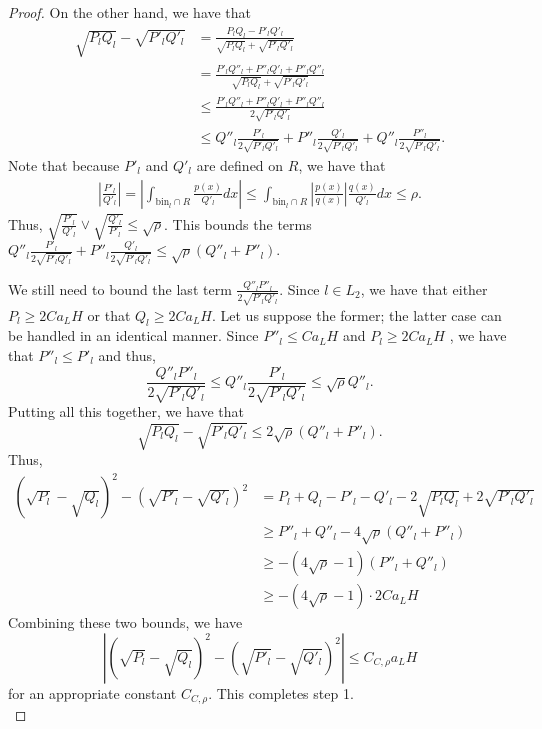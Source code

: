 \documentclass{article}
\newcommand{\bin}{\text{bin}}
\begin{document}
\begin{proof}
On the other hand, we have that
\begin{align*}
\sqrt{P_l Q_l} - \sqrt{P'_l Q'_l} 
  &= \frac{ P_l Q_l  - P'_l Q'_l }
          {  \sqrt{P_l Q_l} + \sqrt{P'_l Q'_l} }\\
  &= \frac{ P'_l Q''_l + P''_l Q'_l + P''_l Q''_l} 
          {  \sqrt{ P_l Q_l } + \sqrt{P'_l Q'_l} } \\
  &\leq  \frac{ P'_l Q''_l + P''_l Q'_l + P''_l Q''_l} 
          {  2 \sqrt{P'_l Q'_l} } \\
  &\leq Q''_l \frac{P'_l}{2 \sqrt{P'_l Q'_l}} + P''_l \frac{Q'_l}{2\sqrt{P'_l Q'_l}}
        + Q''_l \frac{P''_l}{2 \sqrt{P'_l Q'_l}}. 
\end{align*}
Note that because $P'_l$ and $Q'_l$ are defined on $R$, we have that
\begin{align*}
\left| \frac{P'_l}{Q'_l} \right| =
\left| \int_{\bin_l \cap R} \frac{ p(x)}{Q'_l} dx \right| 
 \leq \int_{\bin_l \cap R} \left| \frac{p(x)}{q(x)} \right| \frac{q(x)}{Q'_l} dx 
 \leq \rho. 
\end{align*}
Thus, $\sqrt{ \frac{P'_l}{Q'_l} } \vee \sqrt{ \frac{Q'_l}{P'_l}} \leq \sqrt{\rho}$. This bounds the terms $ Q''_l \frac{P'_l}{2 \sqrt{P'_l Q'_l}} + P''_l \frac{Q'_l}{2\sqrt{P'_l Q'_l}} \leq \sqrt{\rho} (Q''_l + P''_l)$. 

We still need to bound the last term $\frac{Q''_l P''_l}{2 \sqrt{P'_l Q'_l}}$. Since $l \in L_2$, we have that either $P_l \geq 2 C a_L H$ or that $Q_l \geq 2 C a_L H$. Let us suppose the former; the latter case can be handled in an identical manner. Since $P''_l \leq C a_L H$ and $P_l \geq 2C a_L H$ , we have that $P''_l \leq P'_l$ and thus, 
$$\frac{Q''_l P''_l}{2 \sqrt{P'_l Q'_l}} \leq Q''_l \frac{P'_l}{2 \sqrt{P'_l Q'_l}} \leq \sqrt{\rho} Q''_l.$$
Putting all this together, we have that
\[
\sqrt{P_l Q_l} - \sqrt{P'_l Q'_l} \leq 2\sqrt{\rho} (Q''_l + P''_l).
\]
Thus, 
\begin{align*}
(\sqrt{P_l} - \sqrt{Q_l})^2 - (\sqrt{P'_l} - \sqrt{Q'_l})^2 &=
   P_l + Q_l - P'_l - Q'_l - 2 \sqrt{P_l Q_l} + 2 \sqrt{P'_l Q'_l} \\
  &\geq P''_l + Q''_l - 4\sqrt{\rho}( Q''_l + P''_l) \\
  &\geq -(4\sqrt{\rho}-1) (P''_l + Q''_l) \\
  &\geq - (4\sqrt{\rho}-1)\cdot 2 C a_L H
\end{align*}
Combining these two bounds, we have
\[
\left| (\sqrt{P_l} - \sqrt{Q_l})^2 - (\sqrt{P'_l} - \sqrt{Q'_l})^2 \right| \leq C_{C, \rho} a_L H
\]
for an appropriate constant $C_{C, \rho}$. This completes step 1.\\



\end{proof}
\end{document}
